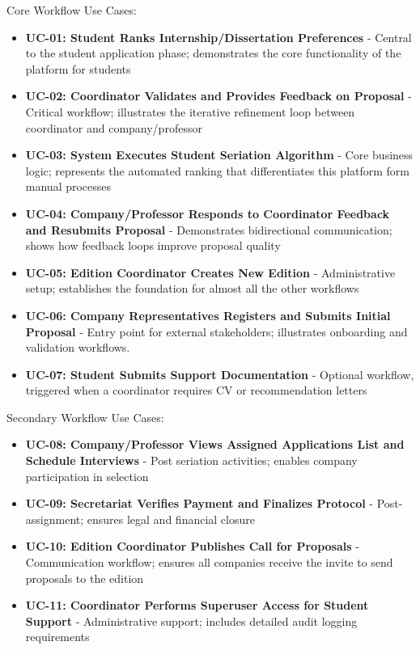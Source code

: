         {
            Core Workflow Use Cases:
        }
        \begin{itemize}
            \item {
                \textbf{UC-01: Student Ranks Internship/Dissertation Preferences} - Central to the student application phase;
                demonstrates the core functionality of the platform for students
            }
            \item {
                \textbf{UC-02: Coordinator Validates and Provides Feedback on Proposal} - Critical workflow; illustrates the 
                iterative refinement loop between coordinator and company/professor
            }
            \item {
                \textbf{UC-03: System Executes Student Seriation Algorithm} - Core business logic; represents the automated 
                ranking that differentiates this platform form manual processes
            }
            \item {
                \textbf{UC-04: Company/Professor Responds to Coordinator Feedback and Resubmits Proposal} - Demonstrates bidirectional
                communication; shows how feedback loops improve proposal quality 
            }
            \item {
                \textbf{UC-05: Edition Coordinator Creates New Edition} - Administrative setup; establishes the foundation for
                almost all the other workflows
            }
            \item {
                \textbf{UC-06: Company Representatives Registers and Submits Initial Proposal} - Entry point for external stakeholders;
                illustrates onboarding and validation workflows.
            }
            \item {
                \textbf{UC-07: Student Submits Support Documentation} - Optional workflow, triggered when a coordinator requires CV or recommendation letters 
            }
        \end{itemize}
        
        {
            Secondary Workflow Use Cases:
        }
        \begin{itemize}
            \item {
                \textbf{UC-08: Company/Professor Views Assigned Applications List and Schedule Interviews} - 
                Post seriation activities; enables company participation in selection
            }
            \item {
                \textbf{UC-09: Secretariat Verifies Payment and Finalizes Protocol} - Post-assignment; ensures legal and 
                financial closure
            }
            \item {
                \textbf{UC-10: Edition Coordinator Publishes Call for Proposals} - Communication workflow; 
                ensures all companies receive the invite to send proposals to the edition
            }
            \item {
                \textbf{UC-11: Coordinator Performs Superuser Access for Student Support} - Administrative support;
                includes detailed audit logging requirements
            }
        \end{itemize}

